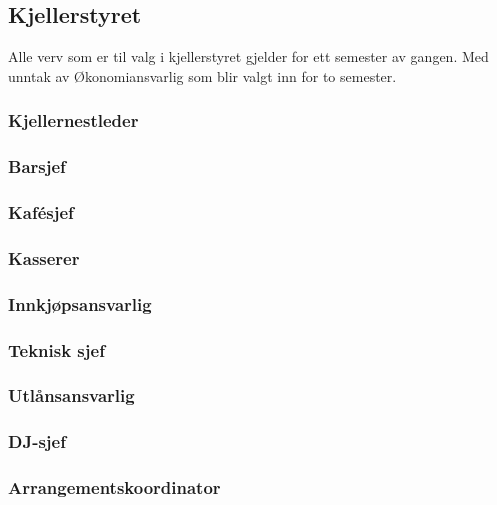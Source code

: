 \documentclass[10pt,norsk,a4paper,usenames,dvipsnames]{article}
\begin{document}
\begin{minipage}[t]{0.5\textwidth}
    \subsection{Kjellerstyret} %
        Alle verv som er til valg i kjellerstyret gjelder for ett semester av gangen. Med unntak av Økonomiansvarlig som blir valgt inn for to semester.

        \subsubsection{Kjellernestleder}


        \subsubsection{Barsjef}


        \subsubsection{Kafésjef}


        \subsubsection{Kasserer}


        \subsubsection{Innkjøpsansvarlig}


        \subsubsection{Teknisk sjef}


        \subsubsection{Utlånsansvarlig}


        \subsubsection{DJ-sjef}


        \subsubsection{Arrangementskoordinator}
\end{minipage}
\end{document}

